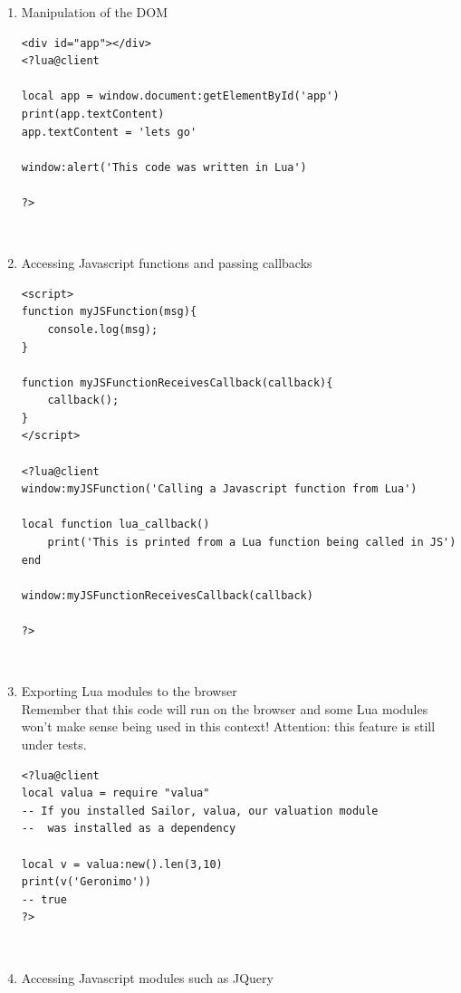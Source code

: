 \documentclass{article}
\begin{document}
\begin{enumerate}\item Manipulation of the DOM\\

\begin{lstlisting}[frame=single]
<div id="app"></div>
<?lua@client

local app = window.document:getElementById('app')
print(app.textContent)
app.textContent = 'lets go'

window:alert('This code was written in Lua')

?>
\end{lstlisting}\\

\item Accessing Javascript functions and passing callbacks\\

\begin{lstlisting}[frame=single]
<script>
function myJSFunction(msg){
    console.log(msg);
}

function myJSFunctionReceivesCallback(callback){
    callback();
}
</script>

<?lua@client
window:myJSFunction('Calling a Javascript function from Lua')

local function lua_callback()
    print('This is printed from a Lua function being called in JS')
end

window:myJSFunctionReceivesCallback(callback)

?>
\end{lstlisting}\\

\item Exporting Lua modules to the browser\\

Remember that this code will run on the browser and some Lua modules won't make sense being used in this context! Attention: this feature is still under tests.\\

\begin{lstlisting}[frame=single]
<?lua@client
local valua = require "valua"
-- If you installed Sailor, valua, our valuation module
--  was installed as a dependency

local v = valua:new().len(3,10)
print(v('Geronimo'))
-- true
?>
\end{lstlisting}\\

\item Accessing Javascript modules such as JQuery\\


\end{enumerate}
\end{document}
